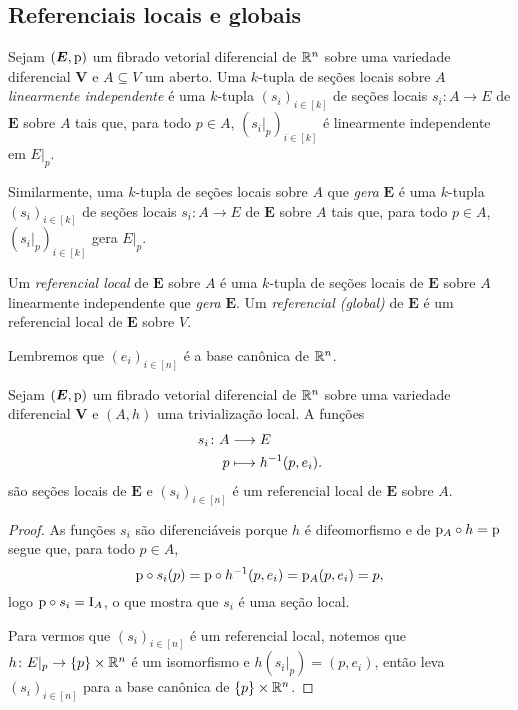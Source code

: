 \subsection{Referenciais locais e globais}

\begin{definition}
Sejam $(\bm E,\mathrm{p})$ um fibrado vetorial diferencial de $\mathbb{R}^n$ sobre uma variedade diferencial $\bm V$ e $A \subseteq V$ um aberto. Uma $k$-tupla de seções locais sobre $A$ \emph{linearmente independente} é uma $k$-tupla $(s_i)_{i \in [k]}$ de seções locais $s_i\colon A \to E$ de $\bm E$ sobre $A$ tais que, para todo $p \in A$, $(s_i|_p)_{i \in [k]}$ é linearmente independente em $E|_p$.

Similarmente, uma $k$-tupla de seções locais sobre $A$ que \emph{gera} $\bm E$ é uma $k$-tupla $(s_i)_{i \in [k]}$ de seções locais $s_i\colon A \to E$ de $\bm E$ sobre $A$ tais que, para todo $p \in A$, $(s_i|_p)_{i \in [k]}$ gera $E|_p$.

Um \emph{referencial local} de $\bm E$ sobre $A$ é uma $k$-tupla de seções locais de $\bm E$ sobre $A$ linearmente independente que \emph{gera} $\bm E$. Um \emph{referencial (global)} de $\bm E$ é um referencial local de $\bm E$ sobre $V$.
\end{definition}

Lembremos que $(e_i)_{i \in [n]}$ é a base canônica de $\mathbb{R}^n$.

\begin{proposition}
Sejam $(\bm E,\mathrm{p})$ um fibrado vetorial diferencial de $\mathbb{R}^n$ sobre uma variedade diferencial $\bm V$ e $(A,h)$ uma trivialização local. A funções
	\begin{align*}
	{s_i}\colon {A} &\longrightarrow {E} \\{p} &\longmapsto h^{-1} (p,e_i).
	\end{align*}
são seções locais de $\bm E$ e $(s_i)_{i \in [n]}$ é um referencial local de $\bm E$ sobre $A$.
\end{proposition}
\begin{proof}
As funções $s_i$ são diferenciáveis porque $h$ é difeomorfismo e de $\mathrm{p}_A \circ h = \mathrm{p}$ segue que, para todo $p \in A$,
	\begin{equation*}
	\mathrm{p} \circ s_i(p) = \mathrm{p} \circ h^{-1} (p,e_i) = \mathrm{p}_A (p,e_i) = p,
	\end{equation*}
logo $\mathrm{p} \circ s_i = \mathrm{I}_A$, o que mostra que $s_i$ é uma seção local.

Para vermos que $(s_i)_{i \in [n]}$ é um referencial local, notemos que $h\colon E|_p \to \{p\} \times \mathbb{R}^n$ é um isomorfismo e $h(s_i|_p) = (p,e_i)$, então leva $(s_i)_{i \in [n]}$ para a base canônica de $\{p\} \times \mathbb{R}^n$.
\end{proof}

